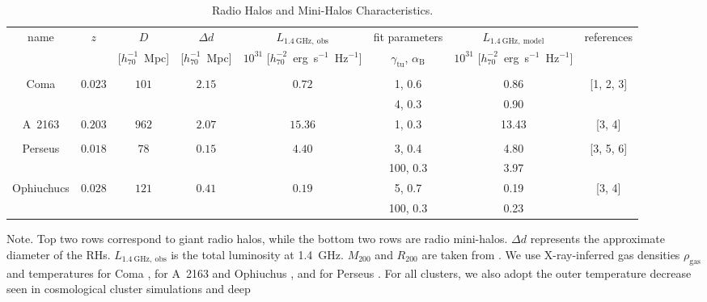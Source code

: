 \documentclass[traditabstract]{aa}
\newcommand{\rmn}{\mathrm}
\begin{document}
\begin{table}[t]
\begin{center}
\caption{Radio Halos and Mini-Halos Characteristics.}
\medskip
\begin{tabular}{cccccccc}
\hline
\phantom{\Big|}
name & $z$ & $D$ & $\Delta d$ & $L_{1.4~\rmn{GHz},~\rmn{obs}}$ & fit parameters & $L_{1.4~\rmn{GHz},~\rmn{model}}$ & references \\
\phantom{\Big|}
           &   & [$h_{70}^{-1}$~Mpc] & [$h_{70}^{-1}$~Mpc] & $10^{31}$ [$h_{70}^{-2}$~erg~s$^{-1}$~Hz$^{-1}$] & $\gamma_{\rmn{tu}}$, $\alpha_{\rmn{B}}$ & $10^{31}$ [$h_{70}^{-2}$~erg~s$^{-1}$~Hz$^{-1}$] & \\
\hline \\[-0.5em]
Coma           & $0.023$ & $101$ & $2.15$ & $0.72$  & 1, 0.6  & 0.86 &  [1, 2, 3]   \\
               &         &       &        &                        & 4, 0.3  & 0.90  &  \\
A~2163         & $0.203$ & $962$ & $2.07$ & $15.36$     & 1, 0.3  & 13.43  &  [3, 4]  \\
\hline \\[-0.5em]
Perseus        & $0.018$ & $78$   & $0.15$ & $4.40$ & 3, 0.4   & 4.80 &  [3, 5, 6]  \\
               &         &        &        &                       & 100, 0.3 & 3.97 &  \\
Ophiuchucs     & $0.028$ & $121$  & $0.41$ & $0.19$       & 5, 0.7   & 0.19  &  [3, 4] \\
               &         &        &        &                       & 100, 0.3 & 0.23 &   \\[0.5em]
\hline
\end{tabular}
\label{tab:RadioHalos}
\end{center}
\footnotesize{Note. Top two rows correspond to giant radio halos, while the
  bottom two rows are radio mini-halos. $\Delta d$ represents the approximate
  diameter of the RHs. $L_{1.4~\rmn{GHz},~\rmn{obs}}$ is the total luminosity at
  1.4~GHz. $M_{200}$ and $R_{200}$ are taken from \cite{2002ApJ...567..716R}. We
  use X-ray-inferred gas densities $\rho_{\rmn{gas}}$ and temperatures for Coma
  \citep{1992A&A...259L..31B}, for A~2163 and Ophiuchus
  \citep{2002ApJ...567..716R}, and for Perseus \citep{2003ApJ...590..225C}. For
  all clusters, we also adopt the outer temperature decrease seen in
  cosmological cluster simulations \citep[e.g.,][]{2010MNRAS.409..449P} and deep
}
\end{table}
\end{document}
